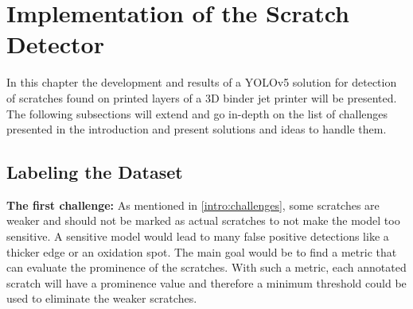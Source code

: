 \section{Implementation of the Scratch Detector}
In this chapter the development and results of a YOLOv5 solution for detection of scratches found on printed layers of a 3D binder jet printer will be presented. The following subsections will extend and go in-depth on the list of challenges presented in the introduction and present solutions and ideas to handle them.

\subsection{Labeling the Dataset}

\textbf{The first challenge:}
As mentioned in \ref{intro:challenges}, some scratches are weaker and should not be marked as actual scratches to not make the model too sensitive. A sensitive model would lead to many false positive detections like a thicker edge or an oxidation spot. The main goal would be to find a metric that can evaluate the prominence of the scratches. With such a metric, each annotated scratch will have a prominence value and therefore a minimum threshold could be used to eliminate the weaker scratches. \\

